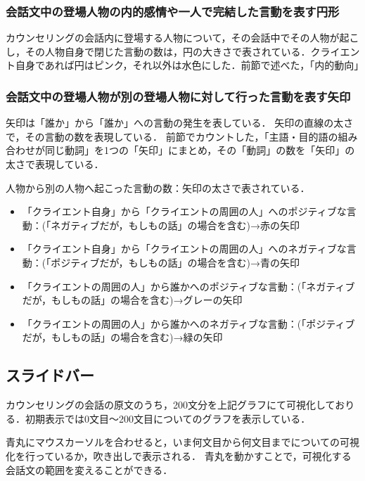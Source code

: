 \documentclass[shuuron]{kuee}
\begin{document}
\subsubsection{会話文中の登場人物の内的感情や一人で完結した言動を表す円形}

カウンセリングの会話内に登場する人物について，その会話中でその人物が起こし，その人物自身で閉じた言動の数は，円の大きさで表されている．クライエント自身であれば円はピンク，それ以外は水色にした．前節で述べた，「内的動向」


\subsubsection{会話文中の登場人物が別の登場人物に対して行った言動を表す矢印}

矢印は「誰か」から「誰か」への言動の発生を表している．
矢印の直線の太さで，その言動の数を表現している．
前節でカウントした，「主語・目的語の組み合わせが同じ動詞」を1つの「矢印」にまとめ，その「動詞」の数を「矢印」の太さで表現している．

人物から別の人物へ起こった言動の数：矢印の太さで表されている．


\begin{itemize}
\item 「クライエント自身」から「クライエントの周囲の人」へのポジティブな言動：(「ネガティブだが，もしもの話」の場合を含む)→赤の矢印
\item 「クライエント自身」から「クライエントの周囲の人」へのネガティブな言動：(「ポジティブだが，もしもの話」の場合を含む)→青の矢印
\item 「クライエントの周囲の人」から誰かへのポジティブな言動：(「ネガティブだが，もしもの話」の場合を含む)→グレーの矢印
\item 「クライエントの周囲の人」から誰かへのネガティブな言動：(「ポジティブだが，もしもの話」の場合を含む)→緑の矢印
\end{itemize}








\subsection{スライドバー}

カウンセリングの会話の原文のうち，200文分を上記グラフにて可視化しておりる．初期表示では0文目〜200文目についてのグラフを表示している．

青丸にマウスカーソルを合わせると，いま何文目から何文目までについての可視化を行っているか，吹き出しで表示される．
青丸を動かすことで，可視化する会話文の範囲を変えることができる．
\end{document}
